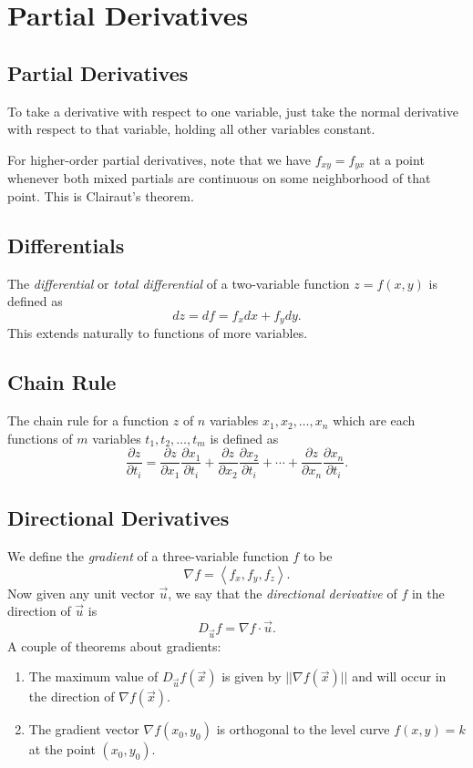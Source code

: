 \documentclass[12pt]{article}
\theoremstyle{definition}
\begin{document}
\section{Partial Derivatives}

\subsection{Partial Derivatives}
To take a derivative with respect to one variable, just take the normal derivative with respect to that variable, holding all other variables constant.

For higher-order partial derivatives, note that we have $f_{xy} = f_{yx}$ at a point whenever both mixed partials are continuous on some neighborhood of that point.
This is Clairaut's theorem.

\subsection{Differentials}
The \textit{differential} or \textit{total differential} of a two-variable function $z=f(x,y)$ is defined as \begin{equation*}
	dz = df = f_x dx + f_y dy.
\end{equation*}
This extends naturally to functions of more variables.

\subsection{Chain Rule}
The chain rule for a function $z$ of $n$ variables $x_1, x_2, \dots, x_n$ which are each functions of $m$ variables $t_1, t_2, \dots, t_m$ is defined as \begin{equation*}
	\frac{\partial z}{\partial t_i} = \frac{\partial z}{\partial x_1}\frac{\partial x_1}{\partial t_i} + \frac{\partial z}{\partial x_2}\frac{\partial x_2}{\partial t_i} + \cdots + \frac{\partial z}{\partial x_n}\frac{\partial x_n}{\partial t_i}.
\end{equation*}

\subsection{Directional Derivatives}
We define the \textit{gradient} of a three-variable function $f$ to be \begin{equation*}
	\nabla f = \left\langle f_x, f_y, f_z \right\rangle.
\end{equation*}
Now given any unit vector $\vec{u}$, we say that the \textit{directional derivative} of $f$ in the direction of $\vec{u}$ is \begin{equation*}
	D_{\vec{u}}f = \nabla f \cdot \vec{u}.
\end{equation*}
A couple of theorems about gradients: \begin{enumerate}
	\item The maximum value of $D_{\vec{u}}f(\vec{x})$ is given by $||\nabla f(\vec{x})||$ and will occur in the direction of $\nabla f(\vec{x})$.
	\item The gradient vector $\nabla f(x_0, y_0)$ is orthogonal to the level curve $f(x, y) = k$ at the point $(x_0, y_0)$.
\end{enumerate}
\end{document}
